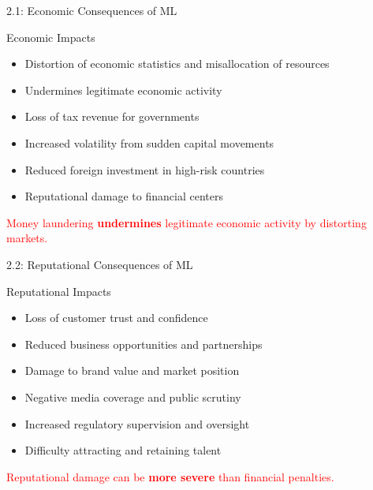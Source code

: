 \documentclass{beamer}
\begin{document}
	
	\begin{frame}{2.1: Economic Consequences of ML}
		\begin{block}{Economic Impacts}
			\begin{itemize}
				\item Distortion of economic statistics and misallocation of resources
				\item Undermines legitimate economic activity
				\item Loss of tax revenue for governments
				\item Increased volatility from sudden capital movements
				\item Reduced foreign investment in high-risk countries
				\item Reputational damage to financial centers
			\end{itemize}
		\end{block}
		\textcolor{red}{Money laundering \textbf{undermines} legitimate economic activity by distorting markets.}
	\end{frame}
	
	\begin{frame}{2.2: Reputational Consequences of ML}
		\begin{block}{Reputational Impacts}
			\begin{itemize}
				\item Loss of customer trust and confidence
				\item Reduced business opportunities and partnerships
				\item Damage to brand value and market position
				\item Negative media coverage and public scrutiny
				\item Increased regulatory supervision and oversight
				\item Difficulty attracting and retaining talent
			\end{itemize}
		\end{block}
		\textcolor{red}{Reputational damage can be \textbf{more severe} than financial penalties.}
	\end{frame}
	
\end{document}
